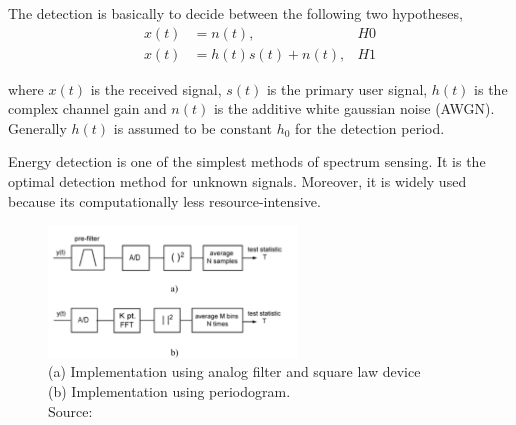 The detection is basically to decide between the following two hypotheses,
\begin{align}
    x(t) &= n(t), & H0 \nonumber \\
    x(t) &= h(t)s(t) + n(t), & H1 \nonumber
\end{align}

where $x(t)$ is the received signal, $s(t)$ is the primary user signal, $h(t)$
is the complex channel gain and $n(t)$ is the additive white gaussian noise
(AWGN). Generally $h(t)$ is assumed to be constant $h_0$ for the detection 
period.

Energy detection is one of the simplest methods of spectrum sensing. It is the 
optimal detection method for unknown signals. Moreover, it is widely used 
because its computationally less resource-intensive.

\begin{figure}
    \centering
    \includegraphics[width=0.59\textwidth]{energyDetection}
    \caption[Energy Detection block diagram]{(a) Implementation using analog 
    filter and square law device \\
    (b) Implementation using periodogram. \\
    \footnotesize{Source: \cite{cabric06}}}
    \label{energyDetection}
\end{figure}


